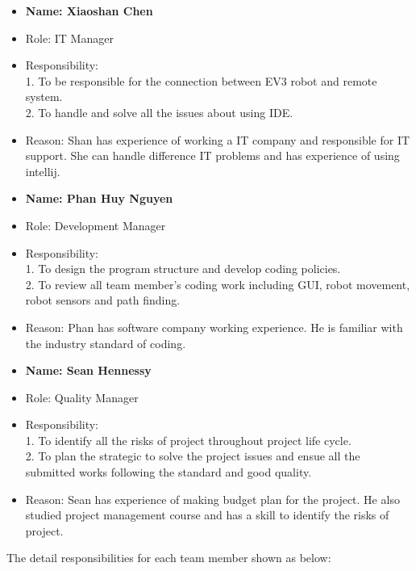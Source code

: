 \begin{itemize}
\item \textbf{Name: Xiaoshan Chen}
\item Role: IT Manager
\item Responsibility:\\
1.	To be responsible for the connection between EV3 robot and remote system.\\
2.	To handle and solve all the issues about using IDE.
\item Reason:
Shan has experience of working a IT company and responsible for IT support. She can handle difference IT problems and has experience of using intellij.
\end{itemize}

\begin{itemize}
\item \textbf{Name: Phan Huy Nguyen}
\item Role: Development Manager
\item Responsibility:\\
1.	To design the program structure and develop coding policies.\\
2.	To review all team member’s coding work including GUI, robot movement, robot sensors and path finding.
\item Reason:
Phan has software company working experience. He is familiar with the industry standard of coding.
\end{itemize}

\begin{itemize}
\item \textbf{Name: Sean Hennessy}
\item Role: Quality Manager
\item Responsibility:\\
1.	To identify all the risks of project throughout project life cycle.\\
2.	To plan the strategic to solve the project issues and ensue all the submitted works following the standard and good quality.
\item Reason:
Sean has experience of making budget plan for the project. He also studied project management course and has a skill to identify the risks of project.
\end{itemize}

The detail responsibilities for each team member shown as below:

